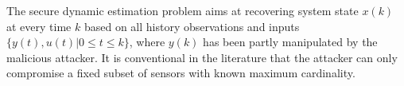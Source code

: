 \documentclass[12pt]{article}  %
\begin{document}
The secure dynamic estimation problem aims at recovering system state $x(k)$ at every time $k$ based on all history observations and inputs $\{y(t),u(t) | 0\leq t\leq k\}$, where $y(k)$ has been partly manipulated by the malicious attacker.
It is conventional in the literature \cite{FawziTAC2014}\cite{Shoukry2017} that the attacker can only compromise a fixed subset of sensors with known maximum cardinality. 
\end{document}
